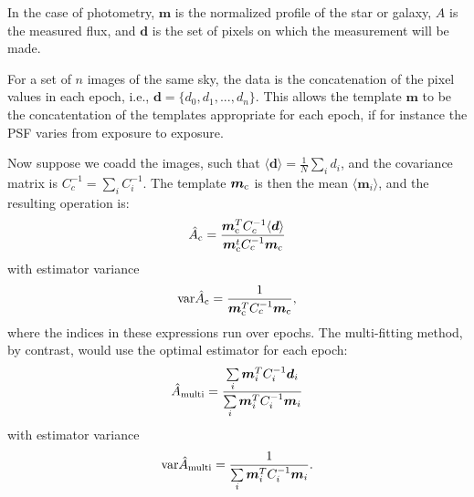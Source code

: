 \documentclass[a4paper,fleqn,usenatbib,referee]{mnras}
\begin{document}
In the case of photometry, $\boldsymbol{m}$ is the normalized profile of the
star or galaxy, $A$ is the measured flux, and $\boldsymbol{d}$ is the set of
pixels on which the measurement will be made.

For a set of $n$ images of the same sky, the data is the concatenation of the
pixel values in each epoch, i.e., $\boldsymbol{d} = \{d_0, d_1, ..., d_n \}$.
This allows the template $\boldsymbol{m}$ to be the concatentation of the
templates appropriate for each epoch, if for instance the PSF varies from
exposure to exposure.

Now suppose we coadd the images, such that $\langle \boldsymbol{d} \rangle = \frac{1}{N}\sum\limits_i
d_i$, and the covariance matrix is $C_c^{-1} = \sum\limits_i C_i^{-1}$.
The template $\boldsymbol{m}_{\rm c}$ is then the mean $\langle
\boldsymbol{m}_i\rangle$, and the resulting operation is:
\begin{align}
    \hat{A}_{\rm c} = \frac{\boldsymbol{m}_{\rm c}^T C_c^{-1} \langle \boldsymbol{d} \rangle}{\boldsymbol{m}_{\rm c}^t C_c^{-1}\boldsymbol{m}_{\rm c}} 
\end{align}
with estimator variance
\begin{align} \label{eq:coaddvarest}
{\rm var}\hat{A}_{\rm c} = \frac{1}{\boldsymbol{m}_{\rm c}^T C_c^{-1}\boldsymbol{m}_{\rm c}},
\end{align}
where the indices in these expressions run over epochs. The multi-fitting
method, by contrast, would use the optimal estimator for each epoch:
\begin{align}
\hat{A}_{\rm multi} = \frac{\sum\limits_i \boldsymbol{m}_i^T C_i^{-1}\boldsymbol{d}_i}{\sum\limits_i \boldsymbol{m}_i^T C_i^{-1}\boldsymbol{m}_i}
\end{align}
with estimator variance
\begin{align}
{\rm var}\hat{A}_{\rm multi} = \frac{1}{\sum\limits_i \boldsymbol{m}_i^T C_i^{-1}\boldsymbol{m}_i}.
\end{align}
\end{document}
